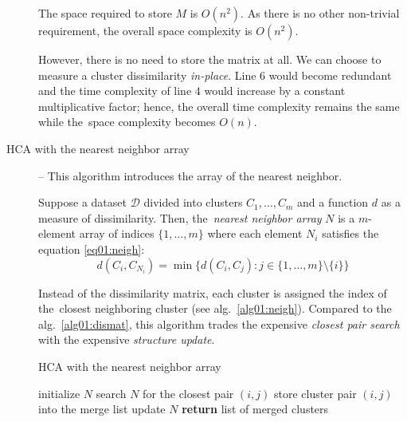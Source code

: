 \begin{description}
	The space required to store $M$ is $O(n^2)$. As there is no other non-trivial requirement, the overall space complexity is $O(n^2)$. 
	\begin{rem}
		However, there is no need to store the matrix at all. We can choose to measure a cluster dissimilarity \emph{in-place}. Line $6$ would become redundant and the time complexity of line $4$ would increase by a constant multiplicative factor; hence, the overall time complexity remains the same while the~space complexity becomes $O(n)$.
	\end{rem}
	

	\item[HCA with the nearest neighbor array] -- This algorithm introduces the array of the nearest neighbor.
	
	\begin{defn}
		Suppose a dataset $\mathcal{D}$ divided into clusters $C_1,\dots,C_m$ and a function $d$ as a measure of dissimilarity. Then, the~\emph{nearest neighbor array} $N$ is a $m$-element array of indices $\{1,\dots,m\}$ where each element $N_i$ satisfies the equation \ref{eq01:neigh}:
		\begin{equation}
		d(C_i,C_{N_i}) = \min\{d(C_i,C_j) : j \in \{1,\dots,m\} \setminus \{i\}\}
		\label{eq01:neigh}
		\end{equation}
		
		\label{def01:neigh}
	\end{defn}
	
	 Instead of the dissimilarity matrix, each cluster is assigned the index of the~closest neighboring cluster (see alg.~\ref{alg01:neigh}). 
	 Compared to the alg.~\ref{alg01:dismat}, this algorithm trades the expensive \emph{closest pair search} with the expensive \emph{structure update}.
	
	
	
	\begin{algorithm}
		\caption{HCA with the nearest neighbor array}
		\label{alg01:neigh}
		\begin{algorithmic}[1]
			\State initialize $N$
			\State search $N$ for the closest pair $(i,j)$ 
			\State store cluster pair $(i,j)$ into the merge list 
			\State update $N$ 
			\EndFor
			\State \textbf{return} list of merged clusters
			\EndProcedure
		\end{algorithmic}
	\end{algorithm}
	

\end{description}

